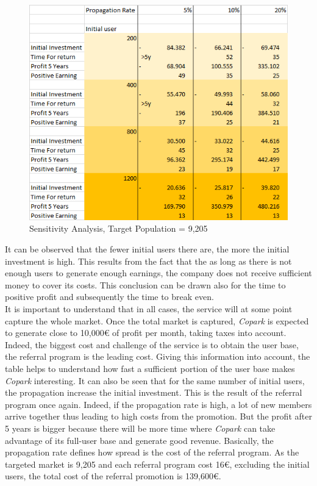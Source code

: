 \documentclass[12pt,a4paper,oneside]{book}
\newcommand{\bp}{\textit{Copark}}
\begin{document}
\begin{figure}[h]
\centering
\caption{Sensitivity Analysis, Target Population = 9,205}
\label{sapg}
\includegraphics[keepaspectratio=true,width=\textwidth-2cm]{../images/sensitivity10.png}
\end{figure}

It can be observed that the fewer initial users there are, the more the initial investment is high. This results from the fact that the as long as there is not enough users to generate enough earnings, the company does not receive sufficient money to cover its costs. This conclusion can be drawn also for the time to positive profit and subsequently the time to break even.\\

It is important to understand that in all cases, the service will at some point capture the whole market. Once the total market is captured, \bp{} is expected to generate close to 10,000\euro{} of profit per month, taking taxes into account. Indeed, the biggest cost and challenge of the service is to obtain the user base, the referral program is the leading cost. Giving this information into account, the table helps to understand how fast a sufficient portion of the user base makes \bp{} interesting. It can also be seen that for the same number of initial users, the propagation increase the initial investment. This is the result of the referral program once again. Indeed, if the propagation rate is high, a lot of  new members arrive together thus leading to high costs from the promotion. But the profit after 5 years is bigger because there will be more time where \bp{} can take advantage of its full-user base and generate good revenue. Basically, the propagation rate defines how spread is the cost of the referral program. As the targeted market is 9,205 and each referral program cost 16\euro{}, excluding the initial users, the total cost of the referral promotion is 139,600\euro{}.\\
\end{document}
